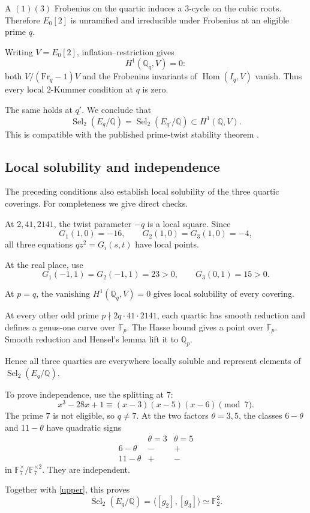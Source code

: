 \documentclass[11pt]{article}
\newcommand{\Q}{\mathbb Q}
\newcommand{\F}{\mathbb F}
\newcommand{\Sel}{\operatorname{Sel}}
\begin{document}
A $(1)(3)$ Frobenius on the quartic induces a
$3$-cycle on the cubic roots.
Therefore $E_0[2]$ is unramified and irreducible
under Frobenius at an eligible prime $q$.

Writing $V=E_0[2]$, inflation--restriction gives
\[
H^1(\Q_q,V)=0:
\]
both $V/(\mathrm{Fr}_q-1)V$ and
the Frobenius invariants of
$\operatorname{Hom}(I_q,V)$ vanish.
Thus every local $2$-Kummer condition at $q$ is zero.

The same holds at $q'$.
We conclude that
\[
\boxed{\Sel_2(E_q/\Q)=\Sel_2(E_{q'}/\Q)
\subset H^1(\Q,V).}
\]
This is compatible with the published prime-twist
stability theorem \cite[Theorem 3.7]{BPT}.

\subsection{Local solubility and independence}

The preceding conditions also establish local solubility
of the three quartic coverings.
For completeness we give direct checks.

At $2,41,2141$, the twist parameter $-q$ is a
local square. Since
\[
G_1(1,0)=-16,\qquad
G_2(1,0)=G_3(1,0)=-4,
\]
all three equations $qz^2=G_i(s,t)$ have local points.

At the real place, use
\[
G_1(-1,1)=G_2(-1,1)=23>0,\qquad
G_3(0,1)=15>0.
\]

At $p=q$, the vanishing $H^1(\Q_q,V)=0$ gives
local solubility of every covering.

At every other odd prime
$p\nmid2q\cdot41\cdot2141$, each quartic has smooth
reduction and defines a genus-one curve over $\F_p$.
The Hasse bound gives a point over $\F_p$.
Smooth reduction and Hensel's lemma lift it to $\Q_p$.

Hence all three quartics are everywhere locally soluble
and represent elements of $\Sel_2(E_q/\Q)$.

To prove independence, use the splitting at $7$:
\[
x^3-28x+1
\equiv(x-3)(x-5)(x-6)\pmod7.
\]
The prime $7$ is not eligible, so $q\ne7$.
At the two factors $\theta=3,5$, the classes
$6-\theta$ and $11-\theta$ have quadratic signs
\[
\begin{array}{c|cc}
&\theta=3&\theta=5\\ \hline
6-\theta&-&+\\
11-\theta&+&-
\end{array}
\]
in $\F_7^\times/\F_7^{\times2}$.
They are independent.

Together with \eqref{upper}, this proves
\begin{equation}\label{selmerplane}
\boxed{
\Sel_2(E_q/\Q)
=\langle[g_2],[g_3]\rangle
\simeq\F_2^2.
}
\end{equation}
\end{document}
